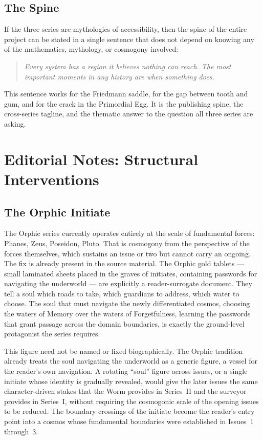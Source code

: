 \documentclass[12pt, a4paper]{article}
\begin{document}
\subsection{The Spine}

If the three series are mythologies of accessibility, then the spine of the entire project can be stated in a single sentence that does not depend on knowing any of the mathematics, mythology, or cosmogony involved:

\begin{quote}
\textit{Every system has a region it believes nothing can reach. The most important moments in any history are when something does.}
\end{quote}

This sentence works for the Friedmann saddle, for the gap between tooth and gum, and for the crack in the Primordial Egg. It is the publishing spine, the cross-series tagline, and the thematic answer to the question all three series are asking.

\newpage
\section{Editorial Notes: Structural Interventions}

\subsection{The Orphic Initiate}

The Orphic series currently operates entirely at the scale of fundamental forces: Phanes, Zeus, Poseidon, Pluto. That is cosmogony from the perspective of the forces themselves, which sustains an issue or two but cannot carry an ongoing. The fix is already present in the source material. The Orphic gold tablets --- small laminated sheets placed in the graves of initiates, containing passwords for navigating the underworld --- are explicitly a reader-surrogate document. They tell a soul which roads to take, which guardians to address, which water to choose. The soul that must navigate the newly differentiated cosmos, choosing the waters of Memory over the waters of Forgetfulness, learning the passwords that grant passage across the domain boundaries, is exactly the ground-level protagonist the series requires.

This figure need not be named or fixed biographically. The Orphic tradition already treats the soul navigating the underworld as a generic figure, a vessel for the reader's own navigation. A rotating ``soul'' figure across issues, or a single initiate whose identity is gradually revealed, would give the later issues the same character-driven stakes that the Worm provides in Series~II and the surveyor provides in Series~I, without requiring the cosmogonic scale of the opening issues to be reduced. The boundary crossings of the initiate become the reader's entry point into a cosmos whose fundamental boundaries were established in Issues~1 through~3.
\end{document}
